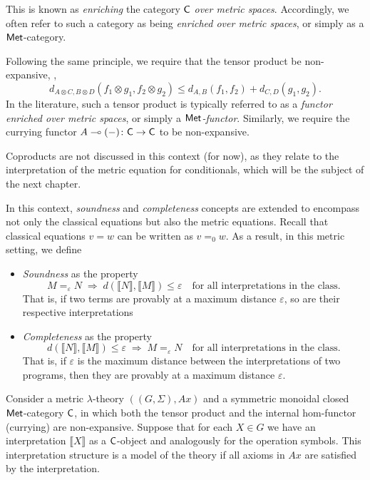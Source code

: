 This is known as \emph{enriching} the category $\mathsf{C}$ \emph{over metric spaces}. Accordingly, we often refer to such a category as being \emph{enriched over metric spaces}, or simply as a $\mathsf{Met}$-category.

Following the same principle, we require that the tensor product be non-expansive, \ie, 
\[
  d_{A \otimes C, B \otimes D}(f_1 \otimes g_1, f_2 \otimes g_2) \leq d_{A,B}(f_1, f_2) + d_{C,D}(g_1, g_2).
\]
In the literature, such a tensor product is typically referred to as a \emph{functor enriched over metric spaces}, or simply a $\mathsf{Met}$\emph{-functor}.
Similarly, we require the currying functor $A \multimap (-) \colon \mathsf{C} \to \mathsf{C}$ to be non-expansive.


Coproducts are not discussed in this context (for now), as they relate to the interpretation of the metric equation for conditionals, which will be the subject of the next chapter.

\vspace{5pt}

In this context, \emph{soundness} and \emph{completeness} concepts are extended to encompass not only the classical equations but also the metric equations. Recall that classical equations $v=w$ can be written as $v=_0w$. As a result, in this metric setting, we define 

\begin{itemize}  
  \item \emph{Soundness} as the property 
\[
 M =_{\varepsilon} N \;\Rightarrow\; d (\llbracket N \rrbracket, \llbracket M \rrbracket) \leq \varepsilon
\quad \text{for all interpretations in the class.}
\]
 That is, if two terms are provably at a maximum distance ${\varepsilon}$, so are their respective interpretations
\item \emph{Completeness} as the property 
\[
 d (\llbracket N \rrbracket, \llbracket M \rrbracket) \leq \varepsilon
\;\Rightarrow\; M =_{\varepsilon} N 
\quad \text{for all interpretations in the class.}
\]
 That is, if ${\varepsilon}$ is the maximum distance between the interpretations of two programs, then they are provably at a maximum distance ${\varepsilon}$.
\end{itemize}


\begin{definition} \label{def:model_metric_no_cond}
 Consider a metric $\lambda$-theory $((G,\Sigma),Ax)$ and a symmetric monoidal closed $\mathsf{Met}$-category $\mathsf{C}$, in which both the tensor product and the internal hom-functor (currying) are non-expansive. Suppose that for each $X \in G$ we have an interpretation $\llbracket X \rrbracket$ as a $\mathsf{C}$-object and analogously for the operation symbols. This interpretation structure is a model of the theory if all axioms in $Ax$ are satisfied by the interpretation.
\end{definition}



